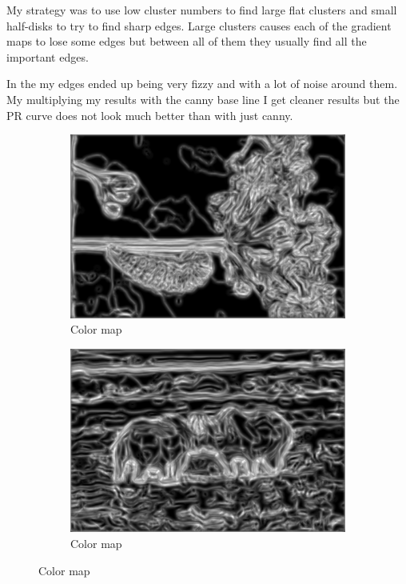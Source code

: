 \documentclass[12pt]{article}
\begin{document}
My strategy was to use low cluster numbers to find large flat clusters and small half-disks to try to find sharp edges. Large clusters causes each of the gradient maps to lose some edges but between all of them they usually find all the important edges. 

In the my edges ended up being very fizzy and with a lot of noise around them. My multiplying my results with the canny base line I get cleaner results but the PR curve does not look much better than with just canny.

\begin{figure}
    \begin{subfigure}[t]{.49\textwidth}
        \centering
        \includegraphics[width=\linewidth]{img/mypb1}
        \caption{Color map}
        \label{fig_bmap1}
    \end{subfigure}\hfill
    \begin{subfigure}[t]{.49\textwidth}
        \centering
        \includegraphics[width=\linewidth]{img/mypb2}
        \caption{Color map}
        \label{fig_bmap2}
    \end{subfigure}


\end{figure}
\end{document}
